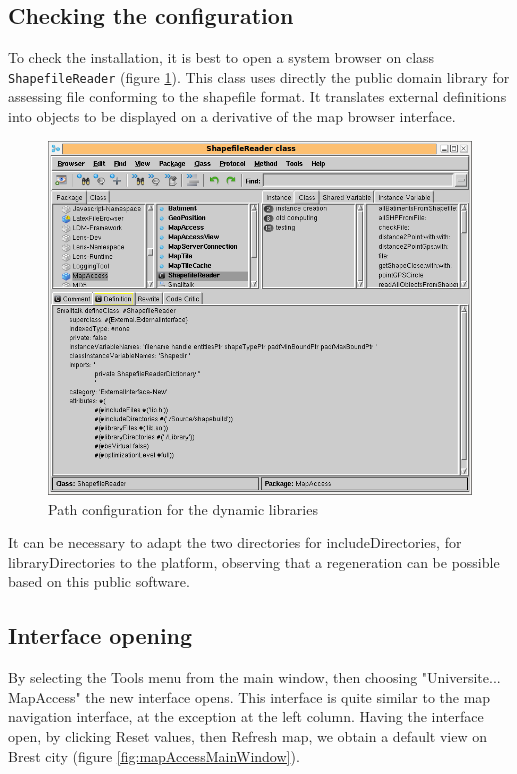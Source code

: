 \subsection{Checking the configuration}

To check the installation, it is best to open a system browser on class 
\verb!ShapefileReader! (figure \ref{fig:configBrowserShp}). 
This class uses directly the public domain library 
for assessing file conforming to the shapefile format. 
It translates external definitions into objects to be displayed 
on a derivative of the map browser interface. 

\begin{figure}
\begin{center}
\includegraphics[width=12cm]{config-browser-shp.png}
\caption{Path configuration for the dynamic libraries}
\label{fig:configBrowserShp}
\end{center}
\end{figure}

It can be necessary to adapt the two directories for includeDirectories, 
for libraryDirectories to the platform, observing that a regeneration can be 
possible based on this public software. 


\subsection{Interface opening}
By selecting the Tools menu from the main window, then choosing "Universite... MapAccess"
the new interface opens. This interface is quite similar to the map navigation interface, at 
the exception at the left column. Having the interface open, by clicking 
Reset values, then Refresh map, we obtain a default view on Brest city 
(figure \ref{fig:mapAccessMainWindow}). 

